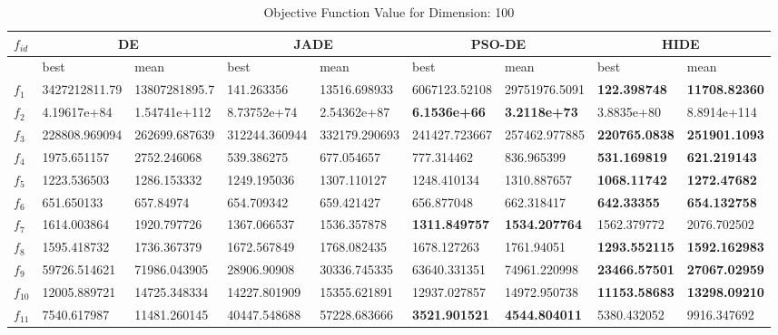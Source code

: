 \begin{table*}[h!]
\centering
\caption{Objective Function Value for Dimension: 100}
\vspace{-3mm}
 \begin{tabular}{|p{0.8cm}|p{1.6cm}|p{1.6cm}|p{1.6cm}|p{1.6cm}|p{1.6cm}|p{1.6cm}|p{1.6cm}|p{1.6cm}|} 
\hline
$f_{id}$ & \multicolumn{2}{c|}{DE} & \multicolumn{2}{c|}{JADE} & \multicolumn{2}{c|}{PSO-DE} & \multicolumn{2}{c|}{HIDE} \\
\hline
    & best & mean & best & mean & best & mean & best & mean \\ [0.5ex] 
\hline
$f_{1}$  & 3427212811.79 & 13807281895.7 & 141.263356 & 13516.698933 & 6067123.52108 & 29751976.5091 & \textbf{122.398748} & \textbf{11708.82360} \\ 
$f_{2}$  & 4.19617e+84 & 1.54741e+112 & 8.73752e+74 & 2.54362e+87 & \textbf{6.1536e+66} & \textbf{3.2118e+73} & 3.8835e+80 & 8.8914e+114 \\ 
$f_{3}$  & 228808.969094 & 262699.687639 & 312244.360944 & 332179.290693 & 241427.723667 & 257462.977885 & \textbf{220765.0838} & \textbf{251901.1093} \\ 
$f_{4}$  & 1975.651157 & 2752.246068 & 539.386275 & 677.054657 & 777.314462 & 836.965399 & \textbf{531.169819} & \textbf{621.219143} \\ 
$f_{5}$  & 1223.536503 & 1286.153332 & 1249.195036 & 1307.110127 & 1248.410134 & 1310.887657 & \textbf{1068.11742} & \textbf{1272.47682} \\ 
$f_{6}$  & 651.650133 & 657.84974 & 654.709342 & 659.421427 & 656.877048 & 662.318417 & \textbf{642.33355} & \textbf{654.132758} \\ 
$f_{7}$  & 1614.003864 & 1920.797726 & 1367.066537 & 1536.357878 & \textbf{1311.849757} & \textbf{1534.207764} & 1562.379772 & 2076.702502 \\ 
$f_{8}$  & 1595.418732 & 1736.367379 & 1672.567849 & 1768.082435 & 1678.127263 & 1761.94051 & \textbf{1293.552115} & \textbf{1592.162983} \\ 
$f_{9}$  & 59726.514621 & 71986.043905 & 28906.90908 & 30336.745335 & 63640.331351 & 74961.220998 & \textbf{23466.57501} & \textbf{27067.02959} \\ 
$f_{10}$  & 12005.889721 & 14725.348334 & 14227.801909 & 15355.621891 & 12937.027857 & 14972.950738 & \textbf{11153.58683} & \textbf{13298.09210} \\ 
$f_{11}$  & 7540.617987 & 11481.260145 & 40447.548688 & 57228.683666 & \textbf{3521.901521} & \textbf{4544.804011} & 5380.432052 & 9916.347692 \\ 

\end{tabular}
\end{table*}
